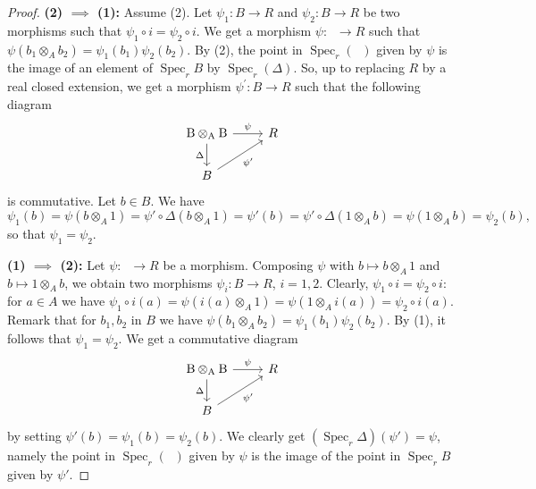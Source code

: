 \documentclass[10pt,a4paper]{amsart}
\DeclareMathOperator{\BAB}{B\otimes_{A} B}
\DeclareMathOperator{\Sp}{Spec}
\begin{document}
\begin{proof}
\textbf{(2) $\implies$ (1):}
Assume (2). Let $\psi_1:B\to R$ and $\psi_2:B\to R$ be two morphisms 
such that $\psi_1\circ  i=\psi_2\circ i$. We get a morphism $\psi:\BAB\to R$ such that $\psi(b_1\otimes_A b_2)=\psi_1(b_1)\psi_2(b_2)$. By (2), the point in $\Sp_r(\BAB)$ given by $\psi$ is the image of an element of $\Sp_r B$ by $\Sp_r(\Delta)$. So, up to replacing $R$ by a real closed extension, we get 
a morphism $\psi^{\prime}:B\to R$ such that the following diagram
$$\begin{tikzcd}
\BAB \arrow[d, "\Delta" '] \arrow[r,"\psi"] & R\\
B \arrow[ur,,"\psi'" ',] &
\end{tikzcd}$$
is commutative. Let $b\in B$. We have 
$$\psi_1(b)=\psi(b\otimes_A 1)=\psi'\circ \Delta(b\otimes_A 1)=\psi'(b)=\psi'\circ \Delta(1 \otimes_A b)=\psi(1\otimes_A b)=\psi_2(b),$$ so that $\psi_1=\psi_2$.

\textbf{(1) $\implies$ (2):}
Let $\psi:\BAB\to R$ be a morphism. Composing $\psi$ with $b\mapsto b\otimes_{A}1$ and $b\mapsto 1\otimes_{A}b$, we obtain two morphisms $\psi_i:B\to R$, $i=1,2$. Clearly, $\psi_1\circ  i=\psi_2\circ  i$: for $a\in A$ we have $\psi_1\circ i(a)=\psi( i(a)\otimes_A 1)=\psi(1\otimes_A  i(a))=\psi_2\circ  i(a)$. Remark that for $b_1,b_2$ in $B$ we have $\psi(b_1\otimes_A b_2)=\psi_1(b_1)\psi_2(b_2)$. By (1), it follows that $\psi_1=\psi_2$. We get a commutative diagram
$$\begin{tikzcd}
\BAB \arrow[d, "\Delta" '] \arrow[r,"\psi"] & R\\
B \arrow[ur,,"\psi'" ',] &
\end{tikzcd}$$
by setting $\psi'(b)=\psi_1(b)=\psi_2(b)$. We clearly get $(\Sp_r \Delta)(\psi')=\psi$, namely the point in 
$\Sp_r (\BAB)$ given by $\psi$ is the image of the point in 
$\Sp_r B$ given by $\psi'$.
\end{proof}
\end{document}
